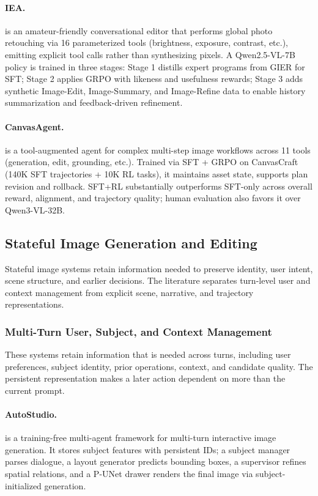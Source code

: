 \paragraph{IEA.}
 is an amateur-friendly conversational editor that performs global photo retouching via 16 parameterized tools (brightness, exposure, contrast, etc.), emitting explicit tool calls rather than synthesizing pixels. A Qwen2.5-VL-7B policy is trained in three stages: Stage 1 distills expert programs from GIER for SFT; Stage 2 applies GRPO with likeness and usefulness rewards; Stage 3 adds synthetic Image-Edit, Image-Summary, and Image-Refine data to enable history summarization and feedback-driven refinement. ~\cite{avg260608016}

\paragraph{CanvasAgent.}
 is a tool-augmented agent for complex multi-step image workflows across 11 tools (generation, edit, grounding, etc.). Trained via SFT + GRPO on CanvasCraft (140K SFT trajectories + 10K RL tasks), it maintains asset state, supports plan revision and rollback. SFT+RL substantially outperforms SFT-only across overall reward, alignment, and trajectory quality; human evaluation also favors it over Qwen3-VL-32B.~\cite{avg260705465}


\subsection{Stateful Image Generation and Editing}
Stateful image systems retain information needed to preserve identity, user intent, scene structure, and earlier decisions. The literature separates turn-level user and context management from explicit scene, narrative, and trajectory representations.

\subsubsection{Multi-Turn User, Subject, and Context Management}
These systems retain information that is needed across turns, including user preferences, subject identity, prior operations, context, and candidate quality. The persistent representation makes a later action dependent on more than the current prompt.

\paragraph{AutoStudio.}
 is a training-free multi-agent framework for multi-turn interactive image generation. It stores subject features with persistent IDs; a subject manager parses dialogue, a layout generator predicts bounding boxes, a supervisor refines spatial relations, and a P-UNet drawer renders the final image via subject-initialized generation.~\cite{cheng2024autostudio}

